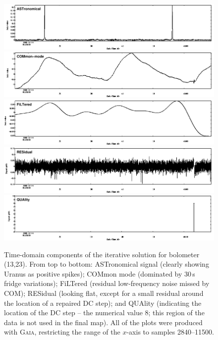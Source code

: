 \documentclass[twoside,11pt]{article}
\newcommand{\xref}[3]{#1}
\renewcommand{\_}{\texttt{\symbol{95}}}
\newcommand{\gaia}{\xref{\textsc{Gaia}}{sun214}{}}
\begin{document}
\begin{figure}
\begin{center}
\includegraphics[width=\linewidth]{sc19_iter_ast} \\
\includegraphics[width=\linewidth]{sc19_iter_com} \\
\includegraphics[width=\linewidth]{sc19_iter_flt} \\
\includegraphics[width=\linewidth]{sc19_iter_res} \\
\includegraphics[width=\linewidth]{sc19_iter_qua} \\
\caption{Time-domain components of the iterative solution for
  bolometer (13,23). From top to bottom: ASTronomical signal (clearly
  showing Uranus as positive spikes); COMmon mode (dominated by 30\,s
  fridge variations); FiLTered (residual low-frequency noise missed by
  COM); RESidual (looking flat, except for a small residual around the
  location of a repaired DC step); and QUAlity (indicating the
  location of the DC step -- the numerical value 8; this region of the
  data is not used in the final map). All of the plots were produced
  with \gaia, restricting the range of the $x$-axis to samples
  2840--11500.}
\label{fig:itercomp}
\end{center}
\end{figure}
\end{document}
